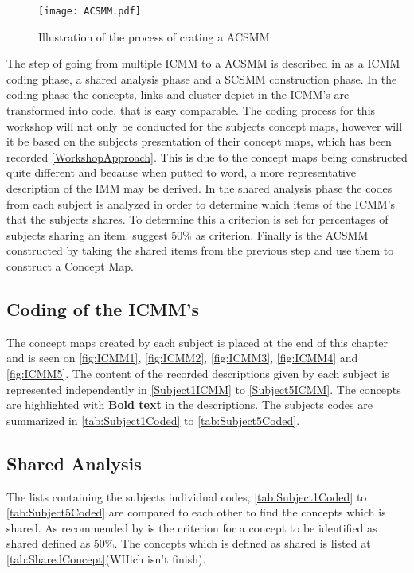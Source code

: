 \begin{figure}[H]
	\centering
	\texttt{[image: ACSMM.pdf]}
	\caption{Illustration of the process of crating a ACSMM}
	\label{fig:ACSMM}
\end{figure}

The step of going from multiple ICMM to a ACSMM is described in \textcite{WEB:ConceptMapAnalysis} as a ICMM coding phase, a shared analysis phase and a SCSMM construction phase. In the coding phase the concepts, links and cluster depict in the ICMM's are transformed into code, that is easy comparable. The coding process for this workshop will not only be conducted for the subjects concept maps, however will it be based on the subjects presentation of their concept maps, which has been recorded \autoref{WorkshopApproach}. This is due to the concept maps being constructed quite different and because when putted to word, a more representative description of the IMM may be derived. In the shared analysis phase the codes from each subject is analyzed in order to determine which items of the ICMM's that the subjects shares. To determine this a criterion is set for percentages of subjects sharing an item. \textcite{WEB:ConceptMapAnalysis} suggest 50\% as criterion. Finally is the ACSMM constructed by taking the shared items from the previous step and use them to construct a Concept Map.

\subsection{Coding of the ICMM's}
\label{ICMMCoding}
The concept maps created by each subject is placed at the end of this chapter and is seen on \autoref{fig:ICMM1}, \autoref{fig:ICMM2}, \autoref{fig:ICMM3}, \autoref{fig:ICMM4} and \autoref{fig:ICMM5}. The content of the recorded descriptions given by each subject is represented independently in \autoref{Subject1ICMM} to \autoref{Subject5ICMM}. The concepts are highlighted with \textbf{Bold text} in the descriptions. The subjects codes are summarized in \autoref{tab:Subject1Coded} to \autoref{tab:Subject5Coded}.

\subsection{Shared Analysis}
\label{SharedAnalysis}
The lists containing the subjects individual codes, \autoref{tab:Subject1Coded} to \autoref{tab:Subject5Coded} are compared to each other to find the concepts which is shared. As recommended by \textcite{WEB:ConceptMapAnalysis} is the criterion for a concept to be identified as shared defined as 50\%. The concepts which is defined as shared is listed at \autoref{tab:SharedConcept}(WHich isn't finish). 


